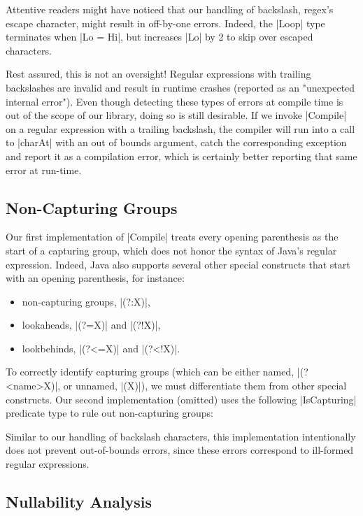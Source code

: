 Attentive readers might have noticed that our handling of backslash, regex's escape character, might result in off-by-one errors.
Indeed, the |Loop| type terminates when |Lo = Hi|, but increases |Lo| by 2 to skip over escaped characters.

Rest assured, this is not an oversight!
Regular expressions with trailing backslashes are invalid and result in runtime crashes (reported as an "unexpected internal error").
Even though detecting these types of errors at compile time is out of the scope of our library, doing so is still desirable.
If we invoke |Compile| on a regular expression with a trailing backslash, the compiler will run into a call to |charAt| with an out of bounds argument, catch the corresponding exception and report it as a compilation error, which is certainly better reporting that same error at run-time.

\subsection{Non-Capturing Groups}
\label{subsec:non-capturing-groups}

Our first implementation of |Compile| treats every opening parenthesis as the start of a capturing group, which does not honor the syntax of Java's regular expression.
Indeed, Java also supports several other special constructs that start with an opening parenthesis, for instance:

\begin{itemize}
  \item non-capturing groups, |(?:X)|,
  \item lookaheads, |(?=X)| and |(?!X)|,
  \item lookbehinds, |(?<=X)| and |(?<!X)|.
\end{itemize}

\noindent
To correctly identify capturing groups (which can be either named, |(?<name>X)|, or unnamed, |(X)|), we must differentiate them from other special constructs.
Our second implementation (omitted) uses the following |IsCapturing| predicate type to rule out non-capturing groups:

\regexIsCapturing

\noindent
Similar to our handling of backslash characters, this implementation intentionally does not prevent out-of-bounds errors, since these errors correspond to ill-formed regular expressions.

\subsection{Nullability Analysis}

